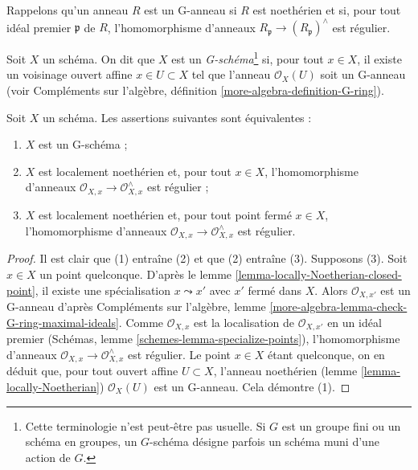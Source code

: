 \noindent
Rappelons qu'un anneau $R$ est un G-anneau si $R$ est noethérien et
si, pour tout idéal premier $\mathfrak p$ de $R$, l'homomorphisme d'anneaux
$R_\mathfrak p \to (R_\mathfrak p)^\wedge$ est régulier.

\begin{definition}
\label{definition-G-scheme}
Soit $X$ un schéma. On dit que $X$ est un {\it G-schéma}\footnote{Cette
terminologie n'est peut-être pas usuelle. Si $G$ est un groupe fini ou un schéma
en groupes, un $G$-schéma désigne parfois un schéma muni d'une
action de $G$.} si, pour tout $x \in X$, il existe un
voisinage ouvert affine $x \in U \subset X$ tel que l'anneau
$\mathcal{O}_X(U)$ soit un G-anneau (voir
Compléments sur l'algèbre, définition \ref{more-algebra-definition-G-ring}).
\end{definition}

\begin{lemma}
\label{lemma-characterize-G-scheme}
Soit $X$ un schéma. Les assertions suivantes sont équivalentes :
\begin{enumerate}
\item $X$ est un G-schéma ;
\item $X$ est localement noethérien et, pour tout $x \in X$, l'homomorphisme
d'anneaux $\mathcal{O}_{X, x} \to \mathcal{O}_{X, x}^\wedge$ est régulier ;
\item $X$ est localement noethérien et, pour tout point fermé $x \in X$,
l'homomorphisme d'anneaux $\mathcal{O}_{X, x} \to \mathcal{O}_{X, x}^\wedge$ est régulier.
\end{enumerate}
\end{lemma}

\begin{proof}
Il est clair que (1) entraîne (2) et que (2) entraîne (3).
Supposons (3). Soit $x \in X$ un point quelconque. D'après
le lemme \ref{lemma-locally-Noetherian-closed-point},
il existe une spécialisation $x \leadsto x'$ avec $x'$ fermé
dans $X$. Alors $\mathcal{O}_{X, x'}$ est un G-anneau
d'après Compléments sur l'algèbre, lemme \ref{more-algebra-lemma-check-G-ring-maximal-ideals}.
Comme $\mathcal{O}_{X, x}$ est la localisation de $\mathcal{O}_{X, x'}$
en un idéal premier (Schémas, lemme \ref{schemes-lemma-specialize-points}),
l'homomorphisme d'anneaux $\mathcal{O}_{X, x} \to \mathcal{O}_{X, x}^\wedge$
est régulier. Le point $x \in X$ étant quelconque, on en déduit
que, pour tout ouvert affine $U \subset X$, l'anneau
noethérien (lemme \ref{lemma-locally-Noetherian}) $\mathcal{O}_X(U)$ est un
G-anneau. Cela démontre (1).
\end{proof}

